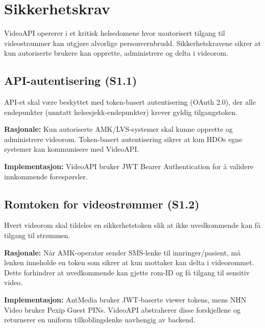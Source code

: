 \section{Sikkerhetskrav}
\label{sec:krav-sikkerhet}

VideoAPI opererer i et kritisk helsedomene hvor uautorisert tilgang til 
videostrømmer kan utgjøre alvorlige personvernbrudd. Sikkerhetskravene 
sikrer at kun autoriserte brukere kan opprette, administrere og delta i 
videorom.

\subsection{API-autentisering (S1.1)}
\label{subsec:krav-s11}

API-et skal være beskyttet med token-basert autentisering (OAuth 2.0), 
der alle endepunkter (unntatt helsesjekk-endepunkter) krever gyldig 
tilgangstoken.

\textbf{Rasjonale:} Kun autoriserte AMK/LVS-systemer skal kunne opprette 
og administrere videorom. Token-basert autentisering sikrer at kun HDOs 
egne systemer kan kommunisere med VideoAPI.

\textbf{Implementasjon:} VideoAPI bruker JWT Bearer Authentication for 
å validere innkommende forespørsler.

\subsection{Romtoken for videostrømmer (S1.2)}
\label{subsec:krav-s12}

Hvert videorom skal tildeles en sikkerhetstoken slik at ikke uvedkommende 
kan få tilgang til strømmen.

\textbf{Rasjonale:} Når AMK-operatør sender SMS-lenke til innringer/pasient, 
må lenken inneholde en token som sikrer at kun mottaker kan delta i 
videorommet. Dette forhindrer at uvedkommende kan gjette rom-ID og få 
tilgang til sensitiv video.

\textbf{Implementasjon:} AntMedia bruker JWT-baserte viewer tokens, mens 
NHN Video bruker Pexip Guest PINs. VideoAPI abstraherer disse forskjellene 
og returnerer en uniform tilkoblingslenke uavhengig av backend.